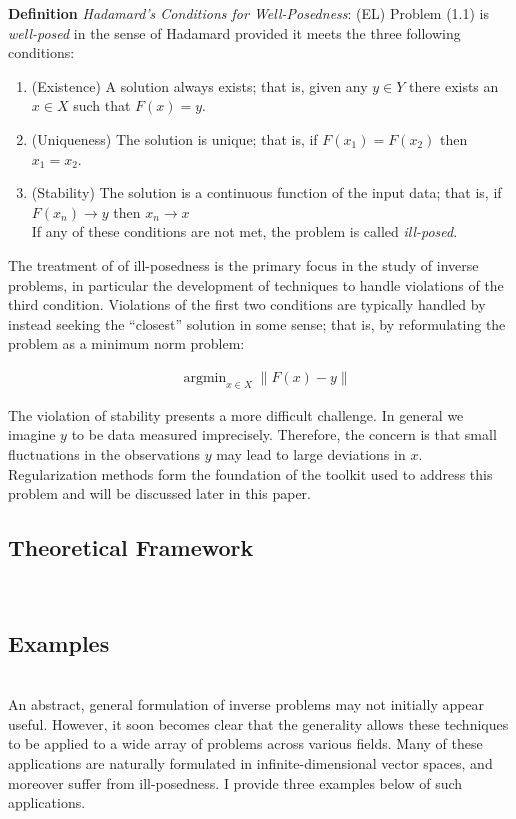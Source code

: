 \documentclass[12pt]{article}
\newcommand*{\norm}[1]{\left\lVert#1\right\rVert}
\DeclareMathOperator*{\argmin}{argmin}
\begin{document}
\textbf{Definition} \textit{Hadamard's Conditions for Well-Posedness}: (EL) Problem (1.1) is \textit{well-posed} in the sense of Hadamard provided it meets the three following conditions: 
\begin{enumerate} 
\item (Existence) A solution always exists; that is, given any $y \in Y$ there exists an $x \in X$ such that $F(x) = y$. 
\item (Uniqueness) The solution is unique; that is, if $F(x_1) = F(x_2)$ then $x_1 = x_2$.
\item (Stability) The solution is a continuous function of the input data; that is, if $F(x_n) \to y$  then $x_n \to x$ \\
If any of these conditions are not met, the problem is called \textit{ill-posed}. 
\end{enumerate} 

The treatment of of ill-posedness is the primary focus in the study of inverse problems, in particular the development of techniques to handle violations of the third condition. Violations of the first two conditions are typically handled by instead seeking the ``closest'' solution in some sense; that is, by reformulating the problem as a minimum norm problem: 

\begin{align*}
&\argmin_{x \in X} \norm{F(x) - y}
\end{align*}
 
 The violation of stability presents a more difficult challenge. In general we imagine $y$ to be data measured imprecisely. Therefore, the concern is that small fluctuations in the observations $y$ may lead to large deviations in $x$. Regularization methods form the foundation of the toolkit used to address this problem and will be discussed later in this paper. 
 
 \subsection{Theoretical Framework} \hfill \\
 
 \subsection{Examples} \hfill \\
 An abstract, general formulation of inverse problems may not initially appear useful. However, it soon becomes clear that the generality allows these techniques to be applied to a wide array of problems across various fields. Many of these applications are naturally formulated in infinite-dimensional vector spaces, and moreover suffer from ill-posedness. I provide three examples below of such applications. 
 
\end{document}
